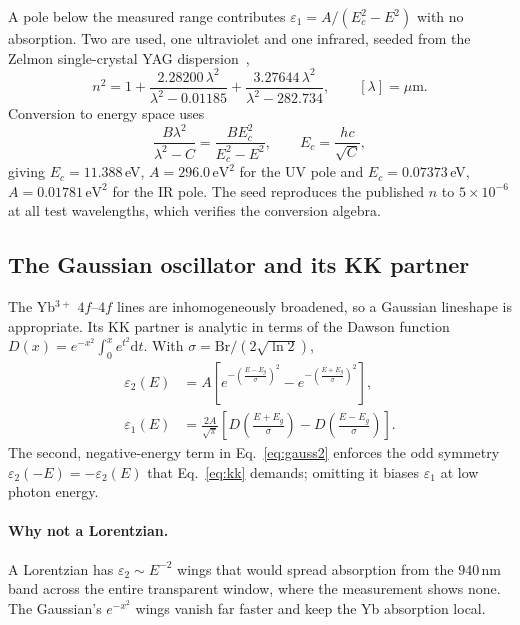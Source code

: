 \documentclass[11pt,a4paper]{article}
\newcommand{\epsm}{\varepsilon}
\newcommand{\lam}{\lambda}
\begin{document}
A pole below the measured range contributes $\epsm_1=A/(E_c^2-E^2)$ with no
absorption. Two are used, one ultraviolet and one infrared, seeded from the
Zelmon single-crystal YAG dispersion~\cite{zelmon},
\begin{equation}
n^2=1+\frac{2.28200\,\lam^2}{\lam^2-0.01185}
      +\frac{3.27644\,\lam^2}{\lam^2-282.734},\qquad [\lam]=\mu\text{m}.
\end{equation}
Conversion to energy space uses
\begin{equation}
\frac{B\lam^2}{\lam^2-C}=\frac{B E_c^2}{E_c^2-E^2},
\qquad E_c=\frac{hc}{\sqrt{C}},
\end{equation}
giving $E_c=11.388$\,eV, $A=296.0\,\mathrm{eV}^2$ for the UV pole and
$E_c=0.07373$\,eV, $A=0.01781\,\mathrm{eV}^2$ for the IR pole. The seed
reproduces the published $n$ to $5\times10^{-6}$ at all test wavelengths, which
verifies the conversion algebra.

\subsection{The Gaussian oscillator and its KK partner}

The Yb$^{3+}$ $4f$--$4f$ lines are inhomogeneously broadened, so a Gaussian
lineshape is appropriate. Its KK partner is analytic in terms of the Dawson
function $D(x)=e^{-x^2}\int_0^x e^{t^2}\mathrm{d}t$. With
$\sigma=\mathrm{Br}/(2\sqrt{\ln2})$,
\begin{align}
\epsm_2(E)&=A\left[e^{-\left(\frac{E-E_g}{\sigma}\right)^2}
                  -e^{-\left(\frac{E+E_g}{\sigma}\right)^2}\right],
\label{eq:gauss2}\\[0.3em]
\epsm_1(E)&=\frac{2A}{\sqrt\pi}\left[
   D\!\left(\frac{E+E_g}{\sigma}\right)-D\!\left(\frac{E-E_g}{\sigma}\right)
   \right].
\label{eq:gauss1}
\end{align}
The second, negative-energy term in Eq.~\eqref{eq:gauss2} enforces the odd
symmetry $\epsm_2(-E)=-\epsm_2(E)$ that Eq.~\eqref{eq:kk} demands; omitting it
biases $\epsm_1$ at low photon energy.

\paragraph{Why not a Lorentzian.} A Lorentzian has $\epsm_2\sim E^{-2}$ wings
that would spread absorption from the $940$\,nm band across the entire
transparent window, where the measurement shows none. The Gaussian's
$e^{-x^2}$ wings vanish far faster and keep the Yb absorption local.
\end{document}
